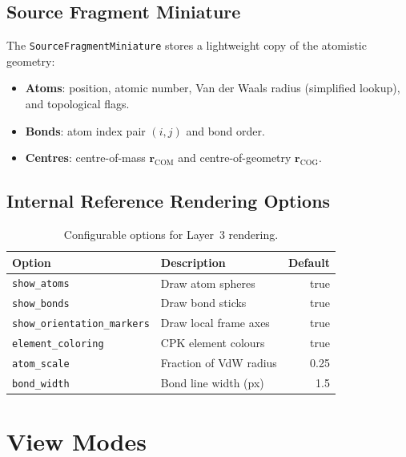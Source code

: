 \documentclass[12pt, a4paper, oneside]{article}
\newcommand{\type}[1]{\texttt{#1}}
\newcommand{\field}[1]{\texttt{#1}}
\newcommand{\Rvec}{\bm{r}}
\begin{document}
\subsection{Source Fragment Miniature}

The \type{SourceFragmentMiniature} stores a lightweight copy of the
atomistic geometry:

\begin{itemize}
  \item \textbf{Atoms}: position, atomic number, Van der Waals radius
        (simplified lookup), and topological flags.
  \item \textbf{Bonds}: atom index pair $(i,j)$ and bond order.
  \item \textbf{Centres}: centre-of-mass $\Rvec_{\text{COM}}$ and
        centre-of-geometry $\Rvec_{\text{COG}}$.
\end{itemize}

\subsection{Internal Reference Rendering Options}

\begin{table}[htbp]
  \centering
  \caption{Configurable options for Layer~3 rendering.}
  \label{tab:internal_ref}
  \begin{tabular}{llr}
    \toprule
    Option & Description & Default \\
    \midrule
    \field{show\_atoms}              & Draw atom spheres         & true  \\
    \field{show\_bonds}              & Draw bond sticks          & true  \\
    \field{show\_orientation\_markers}& Draw local frame axes    & true  \\
    \field{element\_coloring}        & CPK element colours       & true  \\
    \field{atom\_scale}              & Fraction of VdW radius    & 0.25  \\
    \field{bond\_width}              & Bond line width (px)      & 1.5   \\
    \bottomrule
  \end{tabular}
\end{table}

\section{View Modes}
\label{sec:viewmodes}
\end{document}
